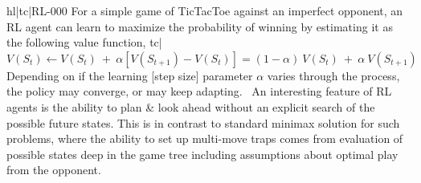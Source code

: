 hl|tc|RL-000
For a simple game of TicTacToe against an imperfect opponent, an RL agent can learn to maximize the probability of winning by estimating it as the following value function,
tc| \( V(S_t) \leftarrow V(S_t) \ + \ \alpha[V(S_{t+1}) - V(S_t)] = (1 - \alpha) \ V(S_t) \ + \ \alpha \ V(S_{t+1}) \)
Depending on if the learning [step size] parameter \(\alpha\) varies through the process, the policy may converge, or may keep adapting. 
An interesting feature of RL agents is the ability to plan & look ahead without an explicit search of the possible future states. This is in contrast to standard minimax solution for such problems, where the ability to set up multi-move traps comes from evaluation of possible states deep in the game tree including assumptions about optimal play from the opponent.